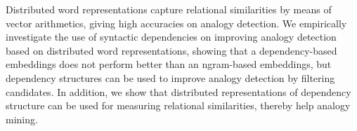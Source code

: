 Distributed word representations capture relational similarities by means of vector arithmetics, giving high accuracies on analogy detection. We empirically investigate the use of syntactic dependencies on improving analogy detection based on distributed word representations, showing that a dependency-based embeddings does not perform better than an ngram-based embeddings, but dependency structures can be used to improve analogy detection by filtering candidates. In addition, we show that distributed representations of dependency structure can be used for measuring relational similarities, thereby help analogy mining.
